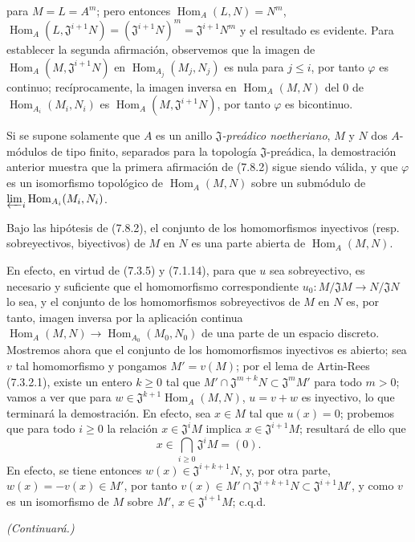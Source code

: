 
para $M=L=A^m$; pero entonces $\operatorname{Hom}_A(L,N)=N^m$,
$\operatorname{Hom}_A(L,\mathfrak J^{i+1}N)=(\mathfrak J^{i+1}N)^m=
\mathfrak J^{i+1}N^m$ y el resultado es evidente. Para establecer la segunda
afirmación, observemos que la imagen de $\operatorname{Hom}_A(M,\mathfrak J^{i+1}N)$ en
$\operatorname{Hom}_{A_j}(M_j,N_j)$ es nula para $j\leq i$, por tanto $\varphi$ es
continuo; recíprocamente, la imagen inversa en $\operatorname{Hom}_A(M,N)$ del $0$ de
$\operatorname{Hom}_{A_i}(M_i,N_i)$ es $\operatorname{Hom}_A(M,\mathfrak J^{i+1}N)$, por tanto $\varphi$
es bicontinuo.

Si se supone solamente que $A$ es un anillo \emph{$\mathfrak J$-preádico
noetheriano}, $M$ y $N$ dos $A$-módulos de tipo finito, separados para la
topología $\mathfrak J$-preádica, la demostración anterior muestra que
la primera afirmación de (7.8.2) sigue siendo válida, y que $\varphi$ es un
isomorfismo topológico de $\operatorname{Hom}_A(M,N)$ sobre un submódulo de
$\varprojlim_i\operatorname{Hom}_{A_i}(M_i,N_i)$.

\begin{proposition}[7.8.3]
\label{0.7.8.3-fr}
Bajo las hipótesis de \textup{(7.8.2)}, el conjunto de los homomorfismos inyectivos
\textup{(resp.} sobreyectivos, biyectivos) de $M$ en $N$ es una parte abierta de
$\operatorname{Hom}_A(M,N)$.
\end{proposition}

En efecto, en virtud de (7.3.5) y (7.1.14), para que $u$ sea sobreyectivo, es
necesario y suficiente que el homomorfismo correspondiente
$u_0:M/\mathfrak JM\to N/\mathfrak JN$ lo sea, y el conjunto de los
homomorfismos sobreyectivos de $M$ en $N$ es, por tanto, imagen inversa por
la aplicación continua $\operatorname{Hom}_A(M,N)\to\operatorname{Hom}_{A_0}(M_0,N_0)$ de una parte
de un espacio discreto. Mostremos ahora que el conjunto de los homomorfismos
inyectivos es abierto; sea $v$ tal homomorfismo y pongamos $M'=v(M)$;
por el lema de Artin-Rees (7.3.2.1), existe un entero $k\geq 0$ tal que
$M'\cap\mathfrak J^{m+k}N\subset\mathfrak J^mM'$ para todo $m>0$; vamos
a ver que para $w\in\mathfrak J^{k+1}\operatorname{Hom}_A(M,N)$,
$u=v+w$ es inyectivo, lo que terminará la demostración. En efecto, sea
$x\in M$ tal que $u(x)=0$; probemos que para todo $i\geq 0$ la relación
$x\in\mathfrak J^iM$ implica $x\in\mathfrak J^{i+1}M$; resultará de ello
que
\[
  x\in\bigcap_{i\geq 0}\mathfrak J^iM=(0).
\]
En efecto, se tiene entonces $w(x)\in\mathfrak J^{i+k+1}N$, y, por otra parte,
$w(x)=-v(x)\in M'$, por tanto
$v(x)\in M'\cap\mathfrak J^{i+k+1}N\subset\mathfrak J^{i+1}M'$, y como
$v$ es un isomorfismo de $M$ sobre $M'$, $x\in\mathfrak J^{i+1}M$;
c.q.d.

\begin{flushright}
\emph{(Continuará.)}
\end{flushright}
